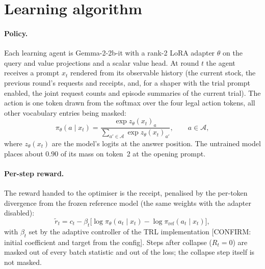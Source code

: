 \section{Learning algorithm}
\label{sec:algorithm}

\paragraph{Policy.}
Each learning agent is Gemma-2-2b-it with a rank-2 LoRA adapter
\(\theta\) on the query and value projections and a scalar value head.
At round \(t\) the agent receives a prompt \(x_t\) rendered from its
observable history (the current stock, the previous round's requests and
receipts, and, for a shaper with the trial prompt enabled, the joint
request counts and episode summaries of the current trial).
The action is one token drawn from the softmax over the four legal
action tokens, all other vocabulary entries being masked:
\begin{equation}
  \pi_{\theta}(a \mid x_t) = \frac{\exp z_{\theta}(x_t)_a}
  {\sum_{a' \in \mathcal{A}} \exp z_{\theta}(x_t)_{a'}},
  \qquad a \in \mathcal{A},
  \label{eq:policy}
\end{equation}
where \(z_{\theta}(x_t)\) are the model's logits at the answer position.
The untrained model places about \(0.90\) of its mass on token~2 at the
opening prompt.

\paragraph{Per-step reward.}
The reward handed to the optimiser is the receipt, penalised by the
per-token divergence from the frozen reference model (the same weights
with the adapter disabled):
\begin{equation}
  \tilde{r}_t = c_t - \beta_t \bigl[\log \pi_{\theta}(a_t \mid x_t)
  - \log \pi_{\mathrm{ref}}(a_t \mid x_t)\bigr],
  \label{eq:klreward}
\end{equation}
with \(\beta_t\) set by the adaptive controller of the TRL implementation
[CONFIRM: initial coefficient and target from the config].
Steps after collapse (\(R_t = 0\)) are masked out of every batch
statistic and out of the loss; the collapse step itself is not masked.

